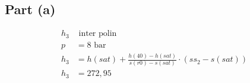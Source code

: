 \subsection*{Part (a)}

\begin{align*}
    h_3 & \text{ inter polin} \\
    p &= 8 \text{ bar} \\
    h_3 &= h(sat) + \frac{h(40) - h(sat)}{s(r0) - s(sat)} \cdot (s s_2 - s(sat)) \\
    h_3 &= 272,95
\end{align*}